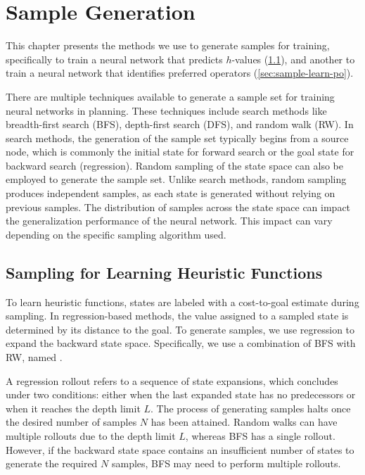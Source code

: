 \documentclass[ppgc,diss,english]{iiufrgs}
\begin{document}
%
%
\chapter{Sample Generation}
\label{cha:sample-gen}
This chapter presents the methods we use to generate samples for training, specifically to train a neural network that predicts $h$-values (\cref{sec:sample-learn-h}), and another to train a neural network that identifies preferred operators (\cref{sec:sample-learn-po}).

There are multiple techniques available to generate a sample set for training neural networks in planning. These techniques include search methods like breadth-first search (BFS), depth-first search (DFS), and random walk (RW). In search methods, the generation of the sample set typically begins from a source node, which is commonly the initial state for forward search or the goal state for backward search (regression). Random sampling of the state space can also be employed to generate the sample set. Unlike search methods, random sampling produces independent samples, as each state is generated without relying on previous samples. The distribution of samples across the state space can impact the generalization performance of the neural network. This impact can vary depending on the specific sampling algorithm used.

\section{Sampling for Learning Heuristic Functions}
\label{sec:sample-learn-h}
To learn heuristic functions, states are labeled with a cost-to-goal estimate during sampling. In regression-based methods, the value assigned to a sampled state is determined by its distance to the goal. To generate samples, we use regression to expand the backward state space. Specifically, we use a combination of BFS with RW, named \bfsrw.

A regression rollout refers to a sequence of state expansions, which concludes under two conditions: either when the last expanded state has no predecessors or when it reaches the depth limit $L$. The process of generating samples halts once the desired number of samples $N$ has been attained. Random walks can have multiple rollouts due to the depth limit $L$, whereas BFS has a single rollout. However, if the backward state space contains an insufficient number of states to generate the required $N$ samples, BFS may need to perform multiple rollouts.
\end{document}
